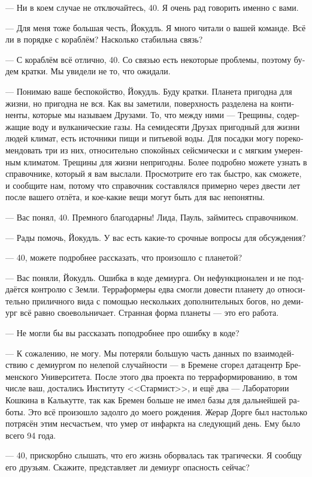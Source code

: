 \documentclass[a4paper,12pt,fleqn]{book}\usepackage{polyglossia}\setdefaultlanguage[babelshorthands=true]{russian}\setotherlanguage{english}\defaultfontfeatures{Ligatures=TeX,Mapping=tex-text}\usepackage{xcolor}\newcommand{\ml}[3]{#2}
\begin{document}
--- Ни в коем случае не отключайтесь, 40.
Я очень рад говорить именно с вами.

--- Для меня тоже большая честь, Йокудль.
Я много читали о вашей команде.
Всё ли в порядке с кораблём?
Насколько стабильна связь?

--- С кораблём всё отлично, 40.
Со связью есть некоторые проблемы, поэтому будем кратки.
Мы увидели не то, что ожидали.

--- Понимаю ваше беспокойство, Йокудль.
Буду кратки.
Планета пригодна для жизни, но пригодна не вся.
Как вы заметили, поверхность разделена на континенты, которые мы называем Друзами.
То, что между ними --- Трещины, содержащие воду и вулканические газы.
На семидесяти Друзах пригодный для жизни людей климат, есть источники пищи и питьевой воды.
Для посадки могу порекомендовать три из них, относительно спокойных сейсмически и с мягким умеренным климатом.
Трещины для жизни непригодны.
Более подробно можете узнать в справочнике, который я вам выслали.
Просмотрите его так быстро, как сможете, и сообщите нам, потому что справочник составлялся примерно через двести лет после вашего отлёта, и кое-какие вещи могут быть для вас непонятны.

--- Вас понял, 40.
Премного благодарны!
Лида, Пауль, займитесь справочником.

--- Рады помочь, Йокудль.
У вас есть какие-то срочные вопросы для обсуждения?

--- 40, можете подробнее рассказать, что произошло с планетой?

--- Вас поняли, Йокудль.
Ошибка в коде демиурга.
Он нефункционален и не поддаётся контролю с Земли.
Терраформеры едва смогли довести планету до относительно приличного вида с помощью нескольких дополнительных богов, но демиург всё равно своевольничает.
Странная форма планеты --- это его работа.

--- Не могли бы вы рассказать поподробнее про ошибку в коде?

--- К сожалению, не могу.
Мы потеряли большую часть данных по взаимодействию с демиургом по нелепой случайности --- в Бремене сгорел датацентр Бременского Университета.
После этого два проекта по терраформированию, в том числе ваш, достались Институту <<Стармист>>, и ещё два --- Лаборатории Кошкина в Калькутте, так как Бремен больше не имел базы для дальнейшей работы.
Это всё произошло задолго до моего рождения.
Жерар Дорге был настолько потрясён этим несчастьем, что умер от инфаркта на следующий день.
Ему было всего 94 года.

--- 40, прискорбно слышать, что его жизнь оборвалась так трагически.
Я сообщу его друзьям.
Скажите, представляет ли демиург опасность сейчас?
\end{document}
